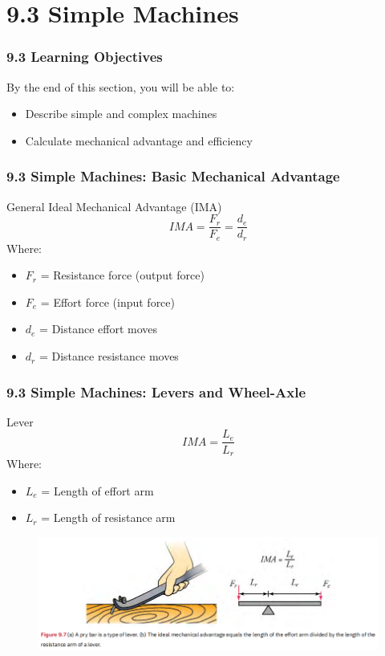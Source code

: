 \documentclass{beamer}
\begin{document}
\section{9.3 Simple Machines}

\begin{frame}
\frametitle{9.3 Learning Objectives}
By the end of this section, you will be able to:
\begin{itemize}
\item Describe simple and complex machines
\item Calculate mechanical advantage and efficiency
\end{itemize}
\end{frame}

\begin{frame}
\frametitle{9.3 Simple Machines: Basic Mechanical Advantage}
\begin{block}{General Ideal Mechanical Advantage (IMA)}
$$IMA = \frac{F_r}{F_e} = \frac{d_e}{d_r}$$
Where:
\begin{itemize}
\item $F_r$ = Resistance force (output force)
\item $F_e$ = Effort force (input force)
\item $d_e$ = Distance effort moves
\item $d_r$ = Distance resistance moves
\end{itemize}
\end{block}
\end{frame}

\begin{frame}
\frametitle{9.3 Simple Machines: Levers and Wheel-Axle}
\begin{block}{Lever}
$$IMA = \frac{L_e}{L_r}$$
Where:
\begin{itemize}
\item $L_e$ = Length of effort arm
\item $L_r$ = Length of resistance arm
\end{itemize}
\end{block}

\begin{figure}
    \centering
    \includegraphics[width=0.75\linewidth]{Lever.png}
\end{figure}
\end{frame}
\end{document}
